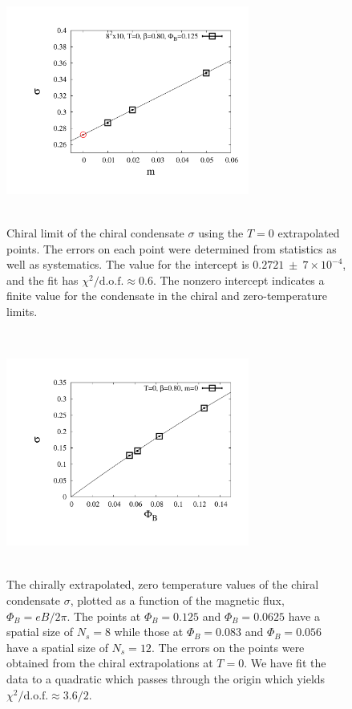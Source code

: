\documentclass[aps,prd,twocolumn,showpacs,superscriptaddress,groupedaddress]{revtex4}  %
\begin{document}
\begin{figure}
  \includegraphics[height=8cm,width=8cm]{pbp_vs_m_PHI0125_zeroT_lin_graphene_paper.pdf} \hspace{-1cm}
\caption{Chiral limit of the chiral condensate $\sigma$ using the $T=0$ extrapolated points. The errors on each point were determined from statistics as well as systematics. The value for the intercept is $0.2721 ~\pm~ 7 \times 10^{-4}$, and the fit has $\chi^2/\text{d.o.f.} \approx 0.6$. The nonzero intercept indicates a finite value for the condensate in the chiral and zero-temperature limits.}
\label{PBPzeroTChiral}
\end{figure}

\begin{figure}
 \includegraphics[height=8cm,width=8cm]{pbp_vs_PHI_graphene_paper.pdf} \hspace{-1cm}
\caption{The chirally extrapolated, zero temperature values of the chiral condensate $\sigma$, plotted as a function of the magnetic flux,  $\Phi_B = eB/2\pi$.  The points at $\Phi_B=0.125$ and $\Phi_B=0.0625$ have a spatial size of $N_s=8$ while those at $\Phi_B=0.083$ and $\Phi_B=0.056$ have a spatial size of $N_s=12$. The errors on the points were obtained from the chiral extrapolations at $T=0$. We have fit the data to a quadratic which passes through the origin which yields $\chi^2/\text{d.o.f.} \approx 3.6/2$. } 
\label{PBPzeroTChiralvseB}
\end{figure} 
\end{document}
